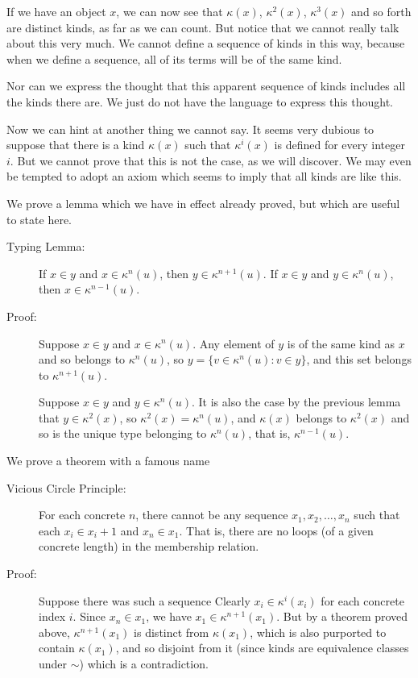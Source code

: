 \documentclass[12pt]{article}
\begin{document}
If we have an object $x$, we can now see that $\kappa(x)$, $\kappa^2(x)$, $\kappa^3(x)$ and so forth are distinct kinds, as far as we can count.  But notice that we cannot really talk about this very much.  We cannot define a sequence of kinds in this way, because when we define a sequence, all of its terms will be of the same kind.

Nor can we express the thought that this apparent sequence of kinds includes all the kinds there are.  We just do not have the language to express this thought.



Now we can hint at another thing we cannot say.  It seems very dubious to suppose that there is a kind $\kappa(x)$ such that $\kappa^i(x)$ is defined for every integer $i$.  But we cannot prove that this is not the case, as we will discover.   We may even be tempted to adopt an axiom which seems to imply that all kinds are like this.

We prove a lemma which we have in effect already proved, but which are useful to state here.

\begin{description}

\item[Typing Lemma:]  If $x \in y$ and $x \in \kappa^n(u)$, then $y \in \kappa^{n+1}(u)$.  If $x \in y$ and $y \in \kappa^n(u)$, then $x \in \kappa^{n-1}(u)$.

\item[Proof:]  Suppose $x \in y$ and $x \in \kappa^n(u)$.  Any element of $y$ is of the same kind as
$x$ and so belongs to $\kappa^n(u)$, so $y = \{v \in \kappa^n(u):v \in y\}$, and this set belongs to $\kappa^{n+1}(u)$.

Suppose $x \in y$ and $y \in \kappa^n(u)$.  It is also the case by the previous lemma that $y \in \kappa^2(x)$, so $\kappa^2(x) = \kappa^n(u)$, and $\kappa(x)$ belongs to $\kappa^2(x)$ and so is the unique type belonging to $\kappa^n(u)$, that is, $\kappa^{n-1}(u)$.





\end{description}

We prove a theorem with a famous name

\begin{description}

\item[Vicious Circle Principle:]  For each concrete $n$, there cannot be any sequence $x_1,x_2,\ldots,x_n$ such that each $x_i \in x_i+1$ and $x_n \in x_1$.  That is, there are no loops (of a given concrete length) in the membership relation.

\item[Proof:]  Suppose there was such a sequence Clearly $x_i \in \kappa^i(x_i)$ for each concrete index $i$.  Since $x_n \in x_1$, we have $x_1 \in \kappa^{n+1}(x_1)$.  But by a theorem proved above,
$\kappa^{n+1}(x_1)$ is distinct from $\kappa(x_1)$, which is also purported to contain $\kappa(x_1)$, and so disjoint from it (since kinds are equivalence classes under $\sim$) which is a contradiction.

\end{description}
\end{document}
